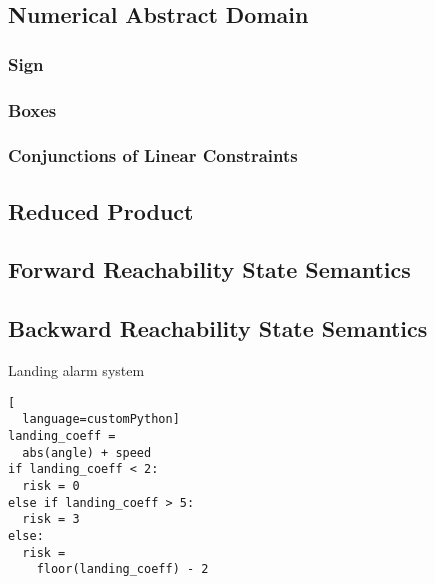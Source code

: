 \subsection{Numerical Abstract Domain}

\subsubsection*{Sign}

\subsubsection*{Boxes}

\subsubsection*{Conjunctions of Linear Constraints}

\subsection{Reduced Product}

\subsection{Forward Reachability State Semantics}

\subsection{Backward Reachability State Semantics}

\begin{marginlisting}
  \caption{Landing alarm system}
  \vspace{\lineheight}
\begin{lstlisting}[
  language=customPython]
landing_coeff =
  abs(angle) + speed
if landing_coeff < 2:
  risk = 0
else if landing_coeff > 5:
  risk = 3
else:
  risk =
    floor(landing_coeff) - 2
  \end{lstlisting}
\end{marginlisting}
